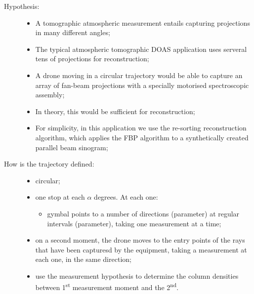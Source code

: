 \begin{description}
    \item[Hypothesis:]
        \begin{itemize}
            \item A tomographic atmospheric measurement entails
                capturing projections in many different angles;
            \item The typical atmospheric tomographic DOAS application
                uses serveral tens of projections for reconstruction;
            \item A drone moving in a circular trajectory would be able
                to capture an array of fan-beam projections with a
                specially motorised spectroscopic assembly;
            \item In theory, this would be sufficient for
                reconstruction;
            \item For simplicity, in this application we use the
                re-sorting reconstruction algorithm, which applies the
                FBP algorithm to a synthetically created parallel beam
                sinogram;
        \end{itemize}
    \item[How is the trajectory defined:\\]
        \begin{itemize}
            \item circular;
            \item one stop at each $\alpha$ degrees. At each one:
                \begin{itemize}
                    \item gymbal points to a number of directions
                        (parameter) at regular intervals (parameter),
                        taking one measurement at a time;
                \end{itemize}
            \item on a second moment, the drone moves to the entry
                points of the rays that have been capturesd by the
                equipment, taking a measurement at each one, in the same
                direction;
            \item use the measurement hypothesis to determine the
                column densities between 1\textsuperscript{st}
                measurement moment and the 2\textsuperscript{nd}.
        \end{itemize}
\end{description}

